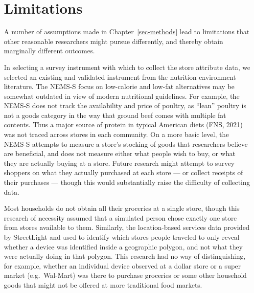 \documentclass[
  letterpaper,
  DIV=11,
  numbers=noendperiod]{scrreport}
\begin{document}
\hypertarget{sec-limitations}{%
\section{Limitations}\label{sec-limitations}}

A number of assumptions made in Chapter~\ref{sec-methods} lead to
limitations that other reasonable researchers might pursue differently,
and thereby obtain marginally different outcomes.

In selecting a survey instrument with which to collect the store
attribute data, we selected an existing and validated instrument from
the nutrition environment literature. The NEMS-S focus on low-calorie
and low-fat alternatives may be somewhat outdated in view of modern
nutritional guidelines. For example, the NEMS-S does not track the
availability and price of poultry, as ``lean'' poultry is not a goods
category in the way that ground beef comes with multiple fat contents.
Thus a major source of protein in typical American diets (FNS, 2021) was
not traced across stores in each community. On a more basic level, the
NEMS-S attempts to measure a store's stocking of goods that researchers
believe are beneficial, and does not measure either what people wish to
buy, or what they are actually buying at a store. Future research might
attempt to survey shoppers on what they actually purchased at each store
--- or collect receipts of their purchases --- though this would
substantially raise the difficulty of collecting data.

Most households do not obtain all their groceries at a single store,
though this research of necessity assumed that a simulated person chose
exactly one store from stores available to them. Similarly, the
location-based services data provided by StreetLight and used to
identify which stores people traveled to only reveal whether a device
was identified inside a geographic polygon, and not what they were
actually doing in that polygon. This research had no way of
distinguishing, for example, whether an individual device observed at a
dollar store or a super market (e.g.~Wal-Mart) was there to purchase
groceries or some other household goods that might not be offered at
more traditional food markets.
\end{document}
